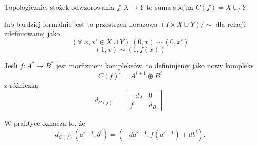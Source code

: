 Topologicznie, stożek odwzorowania $f:X\to Y$ to suma spójna $C(f)=X\cup_fY$:
\begin{center}\end{center}
lub bardziej formalnie jest to przestrzeń ilorazowa $(I\times X\cup Y)/\sim$ dla relacji zdefiniowanej jako 
$$(\forall\;x, x'\in X\cup Y)\;(0,x)\sim (0, x')$$
$$(1, x)\sim (1,f(x))$$

\begin{definition}
  Jeśli $f:A^*\to B^*$ jest morfizmem kompleksów, to definiujemy  jako nowy kompleks
  $$C(f)^i=A^{i+1}\oplus B^i$$
  z różniczką
  $$d_{C(f)}=\begin{bmatrix}-d_A & 0\\ f & d_B\end{bmatrix}.$$
\end{definition}
W praktyce oznacza to, że
$$d_{C(f)}(a^{i+1}, b^i)=(-da^{i+1}, f(a^{i+1})+db^i).$$
 
